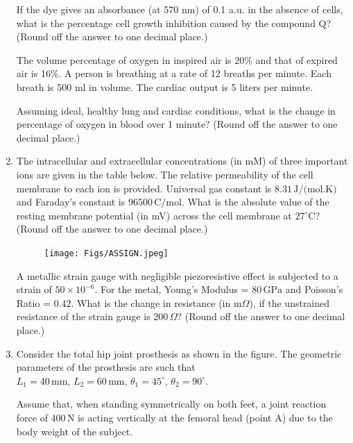 \documentclass[journal]{IEEEtran}
\begin{document}
\begin{enumerate}
\vspace{0.5em}
If the dye gives an absorbance (at 570 nm) of 0.1 a.u. in the absence of cells, what is the percentage cell growth inhibition caused by the compound Q? (Round off the answer to one decimal place.)
\hfill{}


The volume percentage of oxygen in inspired air is 20\% and that of expired air is 16\%. A person is breathing at a rate of 12 breaths per minute. Each breath is 500 ml in volume. The cardiac output is 5 liters per minute.

\vspace{0.5em}
Assuming ideal, healthy lung and cardiac conditions, what is the change in percentage of oxygen in blood over 1 minute? (Round off the answer to one decimal place.)

\hfill{}

\item 
The intracellular and extracellular concentrations (in mM) of three important ions are given in the table below. The relative permeability of the cell membrane to each ion is provided. Universal gas constant is \( 8.31 \, \text{J/(mol.K)} \) and Faraday's constant is \( 96500 \, \text{C/mol} \).
What is the absolute value of the resting membrane potential (in mV) across the cell membrane at \( 27^\circ \text{C} \)? (Round off the answer to one decimal place.)

\begin{figure}[H]
    \centering
    \texttt{[image: Figs/ASSIGN.jpeg]}
    \caption{}
    \label{fig:placeholder}
\end{figure}
\hfill{}


A metallic strain gauge with negligible piezoresistive effect is subjected to a strain of \( 50 \times 10^{-6} \). For the metal, Young's Modulus = \( 80 \, \text{GPa} \) and Poisson's Ratio = \( 0.42 \). What is the change in resistance (in m\(\Omega\)), if the unstrained resistance of the strain gauge is \( 200 \, \Omega \)? (Round off the answer to one decimal place.)
\hfill{}

\item 
Consider the total hip joint prosthesis as shown in the figure. The geometric parameters of the prosthesis are such that 
\( L_1 = 40 \, \text{mm}, \, L_2 = 60 \, \text{mm}, \, \theta_1 = 45^\circ, \, \theta_2 = 90^\circ \). 

Assume that, when standing symmetrically on both feet, a joint reaction force of \( 400 \, \text{N} \) is acting vertically at the femoral head (point A) due to the body weight of the subject. 


\end{enumerate}
\end{document}
